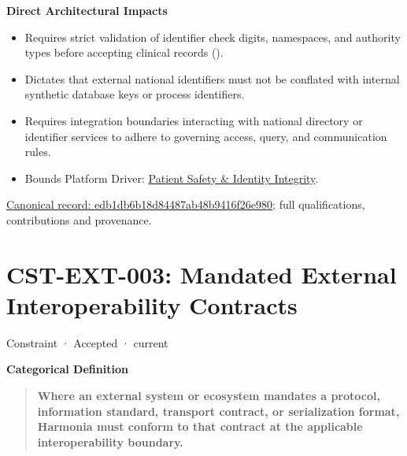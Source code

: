 \par\medskip\textbf{Direct Architectural Impacts}\par


\begin{itemize}


\item Requires strict validation of identifier check digits, namespaces, and authority types before accepting clinical records (\href{\detokenize{../../../../../docs/markdown/01-motivation/requirements-constraints/foundational-requirements.md}}{\texttt{}}).

\item Dictates that external national identifiers must not be conflated with internal synthetic database keys or process identifiers.

\item Requires integration boundaries interacting with national directory or identifier services to adhere to governing access, query, and communication rules.

\item Bounds Platform Driver: \href{\detokenize{../../../../../docs/markdown/01-motivation/drivers-assessments/drivers.md}}{Patient Safety \& Identity Integrity}.

\end{itemize}

{\footnotesize \href{../../../../continuum/motivation/constraint/edb1db6b18d84487ab48b9416f26e980.md}{Canonical record: edb1db6b18d84487ab48b9416f26e980}; full qualifications, contributions and provenance.}\par
\section{CST-EXT-003: Mandated External Interoperability Contracts}

\label{element:cad6d41364ef4bb1ae0a2a519db11da4}
{\small Constraint · Accepted · current}\par

\par\medskip\textbf{Categorical Definition}\par


\begin{quote}


\textbf{Where an external system or ecosystem mandates a protocol, information standard, transport contract, or serialization format, Harmonia must conform to that contract at the applicable interoperability boundary.}



\end{quote}


